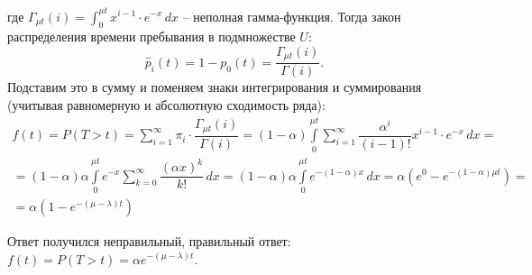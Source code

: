 где $\Gamma_{\mu t}(i) = \int_{0}^{\mu t} x^{i-1} \cdot e^{-x} \, dx$ -- неполная
гамма-функция. Тогда закон распределения времени пребывания в подмножестве $U$:
\[
  \hat{p}_i (t) = 1 - p_0(t) = \dfrac{\Gamma_{\mu t} (i)}{\Gamma(i)}.
\]
Подставим это в сумму и поменяем знаки интегрирования и суммирования
(учитывая равномерную и абсолютную сходимость ряда):
\begin{multline*}
  f(t) = P(T>t) = \sum_{i=1}^\infty \pi_i \cdot \dfrac{\Gamma_{\mu t} (i)}{\Gamma(i)}
  = (1-\alpha) \int\limits_0^{\mu t} \sum_{i=1}^\infty \dfrac{\alpha^i}{(i-1)!} x^{i-1} \cdot e^{-x} \, dx = \\
  = (1-\alpha) \alpha \int\limits_0^{\mu t} e^{-x} \sum_{k=0}^\infty \dfrac{(\alpha x)^k}{k!} \, dx
  = (1-\alpha) \alpha \int\limits_0^{\mu t} e^{-(1-\alpha)x} \, dx
  = \alpha \left( e^{0} - e^{-(1-\alpha)\mu t} \right) = \\
  = \alpha \left( 1 - e^{- (\mu - \lambda) t} \right) 
\end{multline*}

Ответ получился неправильный, правильный ответ:
$f(t) = P(T > t) = \alpha e^{-(\mu - \lambda) t}$.

